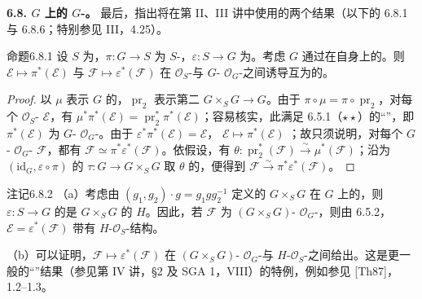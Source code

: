\textbf{6.8. $G$ 上的 $G$-。} 最后，指出将在第 II、III 讲中使用的两个结果（以下的 6.8.1 与 6.8.6；特别参见 III，4.25）。
\begin{SGAresult}{命题}{6.8.1}
设 $S$ 为，$\pi:G\to S$ 为 $S$-，$\varepsilon:S\to G$ 为。考虑 $G$ 通过在自身上的。则 $\mathcal E\mapsto\pi^*(\mathcal E)$ 与 $\mathcal F\mapsto\varepsilon^*(\mathcal F)$ 在 $\mathcal O_S$-与 $G$- $\mathcal O_G$-之间诱导互为的。
\end{SGAresult}
\begin{proof}
以 $\mu$ 表示 $G$ 的，$\operatorname{pr}_2$ 表示第二 $G\times_S G\to G$。由于 $\pi\circ\mu=\pi\circ\operatorname{pr}_2$，对每个 $\mathcal O_S$- $\mathcal E$，有 $\mu^*\pi^*(\mathcal E)=\operatorname{pr}_2^*\pi^*(\mathcal E)$；容易核实，此满足 6.5.1（$\star\star$）的“”，即 $\pi^*(\mathcal E)$ 为 $G$- $\mathcal O_G$-。由于 $\varepsilon^*\pi^*(\mathcal E)=\mathcal E$， $\mathcal E\mapsto\pi^*(\mathcal E)$
；故只须说明，对每个 $G$- $\mathcal O_G$- $\mathcal F$，都有 $\mathcal F\simeq\pi^*\varepsilon^*(\mathcal F)$。依假设，有 $\theta:\operatorname{pr}_2^*(\mathcal F)\xrightarrow\sim\mu^*(\mathcal F)$；沿为 $(\mathrm{id}_G,\varepsilon\circ\pi)$ 的 $\tau:G\to G\times_S G$ 取 $\theta$ 的，便得到 $\mathcal F\xrightarrow\sim\pi^*\varepsilon^*(\mathcal F)$。
\end{proof}
\begin{SGAresult}{注记}{6.8.2}
（a）考虑由 $(g_1,g_2)\cdot g=g_1gg_2^{-1}$ 定义的 $G\times_S G$ 在 $G$ 上的，则 $\varepsilon:S\to G$ 的是 $G\times_S G$ 的 $H$。因此，若 $\mathcal F$ 为 $(G\times_S G)$- $\mathcal O_G$-，则由 6.5.2，$\mathcal E=\varepsilon^*(\mathcal F)$ 带有 $H$-$\mathcal O_S$-结构。

（b）可以证明，$\mathcal F\mapsto\varepsilon^*(\mathcal F)$ 在 $(G\times_S G)$- $\mathcal O_G$-与 $H$-$\mathcal O_S$-之间给出。这是更一般的“”结果（参见第 IV 讲，§2 及 SGA 1，VIII）的特例，例如参见 [Th87]，1.2--1.3。
\end{SGAresult}
